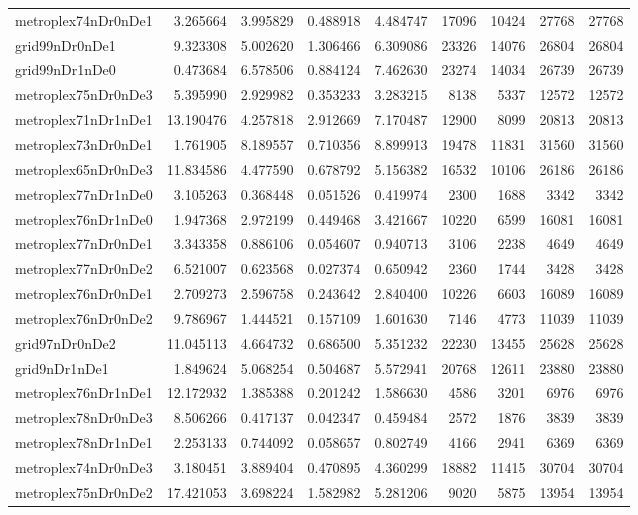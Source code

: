\begin{longtable}{|l|r|r|r|r|r|r|r|r|}
metroplex74nDr0nDe1 & 3.265664 & 3.995829 & 0.488918 & 4.484747 & 17096 & 10424 & 27768 & 27768 \\
grid99nDr0nDe1 & 9.323308 & 5.002620 & 1.306466 & 6.309086 & 23326 & 14076 & 26804 & 26804 \\
grid99nDr1nDe0 & 0.473684 & 6.578506 & 0.884124 & 7.462630 & 23274 & 14034 & 26739 & 26739 \\
metroplex75nDr0nDe3 & 5.395990 & 2.929982 & 0.353233 & 3.283215 & 8138 & 5337 & 12572 & 12572 \\
metroplex71nDr1nDe1 & 13.190476 & 4.257818 & 2.912669 & 7.170487 & 12900 & 8099 & 20813 & 20813 \\
metroplex73nDr0nDe1 & 1.761905 & 8.189557 & 0.710356 & 8.899913 & 19478 & 11831 & 31560 & 31560 \\
metroplex65nDr0nDe3 & 11.834586 & 4.477590 & 0.678792 & 5.156382 & 16532 & 10106 & 26186 & 26186 \\
metroplex77nDr1nDe0 & 3.105263 & 0.368448 & 0.051526 & 0.419974 & 2300 & 1688 & 3342 & 3342 \\
metroplex76nDr1nDe0 & 1.947368 & 2.972199 & 0.449468 & 3.421667 & 10220 & 6599 & 16081 & 16081 \\
metroplex77nDr0nDe1 & 3.343358 & 0.886106 & 0.054607 & 0.940713 & 3106 & 2238 & 4649 & 4649 \\
metroplex77nDr0nDe2 & 6.521007 & 0.623568 & 0.027374 & 0.650942 & 2360 & 1744 & 3428 & 3428 \\
metroplex76nDr0nDe1 & 2.709273 & 2.596758 & 0.243642 & 2.840400 & 10226 & 6603 & 16089 & 16089 \\
metroplex76nDr0nDe2 & 9.786967 & 1.444521 & 0.157109 & 1.601630 & 7146 & 4773 & 11039 & 11039 \\
grid97nDr0nDe2 & 11.045113 & 4.664732 & 0.686500 & 5.351232 & 22230 & 13455 & 25628 & 25628 \\
grid9nDr1nDe1 & 1.849624 & 5.068254 & 0.504687 & 5.572941 & 20768 & 12611 & 23880 & 23880 \\
metroplex76nDr1nDe1 & 12.172932 & 1.385388 & 0.201242 & 1.586630 & 4586 & 3201 & 6976 & 6976 \\
metroplex78nDr0nDe3 & 8.506266 & 0.417137 & 0.042347 & 0.459484 & 2572 & 1876 & 3839 & 3839 \\
metroplex78nDr1nDe1 & 2.253133 & 0.744092 & 0.058657 & 0.802749 & 4166 & 2941 & 6369 & 6369 \\
metroplex74nDr0nDe3 & 3.180451 & 3.889404 & 0.470895 & 4.360299 & 18882 & 11415 & 30704 & 30704 \\
metroplex75nDr0nDe2 & 17.421053 & 3.698224 & 1.582982 & 5.281206 & 9020 & 5875 & 13954 & 13954 \\

\end{longtable}
